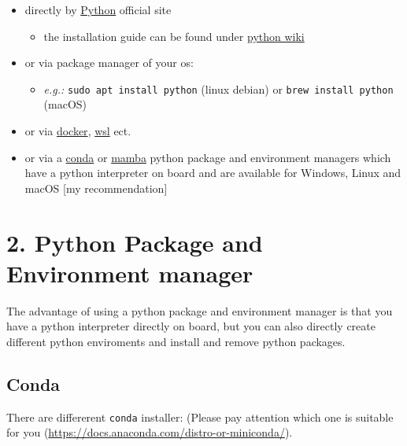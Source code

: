 \documentclass[
  letterpaper,
  DIV=11,
  numbers=noendperiod]{scrreprt}
\providecommand{\tightlist}{%
  \setlength{\itemsep}{0pt}\setlength{\parskip}{0pt}}\usepackage{longtable,booktabs,array}
\begin{document}
\begin{itemize}
\tightlist
\item
  directly by \href{https://www.python.org/downloads/}{Python} official
  site

  \begin{itemize}
  \tightlist
  \item
    the installation guide can be found under
    \href{https://wiki.python.org/moin/BeginnersGuide/Download}{python
    wiki}
  \end{itemize}
\item
  or via package manager of your os:

  \begin{itemize}
  \tightlist
  \item
    \emph{e.g.:} \texttt{sudo\ apt\ install\ python} (linux debian) or
    \texttt{brew\ install\ python} (macOS)
  \end{itemize}
\item
  or via \href{https://www.docker.com/}{docker},
  \href{https://learn.microsoft.com/de-de/windows/wsl/install}{wsl} ect.
\item
  or via a
  \href{https://docs.conda.io/projects/conda/en/latest/index.html}{conda}
  or \href{https://mamba.readthedocs.io/en/latest/index.html}{mamba}
  python package and environment managers which have a python
  interpreter on board and are available for Windows, Linux and macOS
  {[}my recommendation{]}
\end{itemize}

\section*{2. Python Package and Environment
manager}\label{python-package-and-environment-manager}


The advantage of using a python package and environment manager is that
you have a python interpreter directly on board, but you can also
directly create different python enviroments and install and remove
python packages.

\subsection*{Conda}\label{conda}

There are differerent \texttt{conda} installer: (Please pay attention
which one is suitable for you
(\url{https://docs.anaconda.com/distro-or-miniconda/}).
\end{document}
